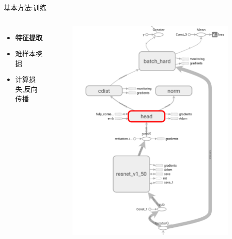 \documentclass[notes]{beamer}
\begin{document}
\begin{frame}
	{基本方法:训练} 
	\begin{columns}
	\begin{itemize}
		\item \textbf{特征提取}
		\item 难样本挖掘
		\item 计算损失,反向传播
	\end{itemize}
	\begin{figure}
		\centering
		\includegraphics[width=\textwidth]{2018-03-15-21-40-06.png}			
	\end{figure}

	\end{columns} 
\end{frame}
\end{document}
